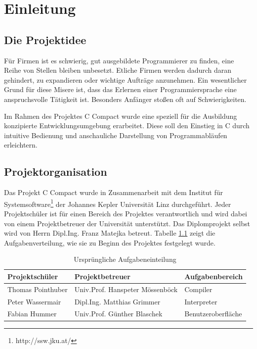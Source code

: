 
\chapter{Einleitung}

\section{Die Projektidee}
Für Firmen ist es schwierig, gut ausgebildete Programmierer zu finden, eine Reihe von Stellen bleiben unbesetzt. Etliche Firmen werden dadurch daran gehindert, zu expandieren oder wichtige Aufträge anzunehmen.
Ein wesentlicher Grund für diese Misere ist, dass das Erlernen einer Programmiersprache eine anspruchsvolle Tätigkeit ist. Besonders Anfänger stoßen oft auf Schwierigkeiten.

Im Rahmen des Projektes C Compact wurde eine speziell für die Ausbildung konzipierte Entwicklungsumgebung erarbeitet. Diese soll den Einstieg in C durch intuitive Bedienung und anschauliche Darstellung von Programmabläufen erleichtern.

\section{Projektorganisation}

Das Projekt C Compact wurde in Zusammenarbeit mit dem Institut für Systemsoftware\footnote{http://ssw.jku.at/} der Johannes Kepler Universität Linz durchgeführt. Jeder Projektschüler ist für einen Bereich des Projektes verantwortlich und wird dabei von einem Projektbetreuer der Universität unterstützt. Das Diplomprojekt selbst wird von Herrn Dipl.Ing. Franz Matejka betreut. Tabelle \ref{tab:intro-work-1} zeigt die Aufgabenverteilung, wie sie zu Beginn des Projektes festgelegt wurde.

\def\arraystretch{1.4}
\begin{table}
\begin{tabular}{|l|l|l|}
\hline
\textbf{Projektschüler}&\textbf{Projektbetreuer}&\textbf{Aufgabenbereich}\\
\hline
Thomas Pointhuber & Univ.Prof. Hanspeter Mössenböck & Compiler \\
Peter Wassermair & Dipl.Ing. Matthias Grimmer & Interpreter \\
Fabian Hummer & Univ.Prof. Günther Blaschek & Benutzeroberfläche\\
\hline
\end{tabular}
\caption{Ursprüngliche Aufgabeneinteilung}
\label{tab:intro-work-1}
\end{table}

